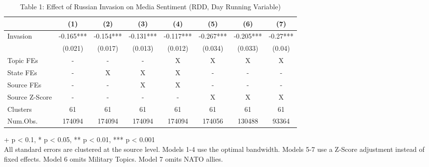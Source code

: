 \begin{table}[!t]
\caption{Table 1: Effect of Russian Invasion on Media Sentiment (RDD, Day Running Variable)} 
\fontsize{12.0pt}{14.4pt}\selectfont
\begin{tabular*}{\linewidth}{@{\extracolsep{\fill}}lccccccc}
\toprule
  & (1) & (2) & (3) & (4) & (5) & (6) & (7) \\ 
\midrule\addlinespace[2.5pt]
Invasion & -0.165*** & -0.154*** & -0.131*** & -0.117*** & -0.267*** & -0.205*** & -0.27*** \\ 
{} & {(0.021)} & {(0.017)} & {(0.013)} & {(0.012)} & {(0.034)} & {(0.033)} & {(0.04)} \\ 
Topic FEs & - & - & - & X & X & X & X \\ 
State FEs & - & X & X & X & - & - & - \\ 
Source FEs & - & - & X & X & - & - & - \\ 
Source Z-Score & - & - & - & - & X & X & X \\ 
Clusters & 61 & 61 & 61 & 61 & 61 & 61 & 61 \\ 
Num.Obs. & 174094 & 174094 & 174094 & 174094 & 174056 & 130488 & 93364 \\ 
\bottomrule
\end{tabular*}
\begin{minipage}{\linewidth}
+ p < 0.1, * p < 0.05, ** p < 0.01, *** p < 0.001\\
All standard errors are clustered at the source level. Models 1-4 use the
optimal bandwidth. Models 5-7 use a Z-Score adjustment instead of fixed effects.
Model 6 omits Military Topics. Model 7 omits NATO allies.\\
\end{minipage}
\end{table}

